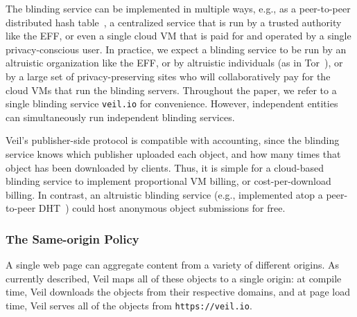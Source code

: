 
The blinding service can be implemented
in multiple ways, e.g., as a peer-to-peer
distributed hash table~\cite{pastry,chord},
a centralized service that is run by a
trusted authority like the EFF,
or even a single cloud VM that is paid for and
operated by a single privacy-conscious user. In
practice, we expect a blinding service to be run
by an altruistic organization like the EFF, or by
altruistic individuals (as in Tor~\cite{tor}),
or by a large set of privacy-preserving
sites who will collaboratively pay for the cloud
VMs that run the blinding servers. Throughout the
paper, we refer to a single blinding service
\texttt{veil.io} for convenience.
However, independent entities can simultaneously
run independent blinding services.

Veil's publisher-side protocol is compatible
with accounting, since the blinding service knows
which publisher uploaded each object, and how many
times that object has been downloaded by clients.
Thus, it is simple for a cloud-based blinding service
to implement proportional VM billing, or cost-per-download
billing. In contrast, an altruistic blinding service
(e.g., implemented atop a peer-to-peer DHT~\cite{pastry,chord})
could host anonymous object submissions for free.

\subsubsection{The Same-origin Policy}
\label{sec:sop}

A single web page can aggregate content from a
variety of different origins. As currently
described, Veil maps all of these objects to
a single origin: at compile time, Veil downloads
the objects from their respective domains, and
at page load time, Veil serves all of the
objects from \texttt{https://veil.io}.

